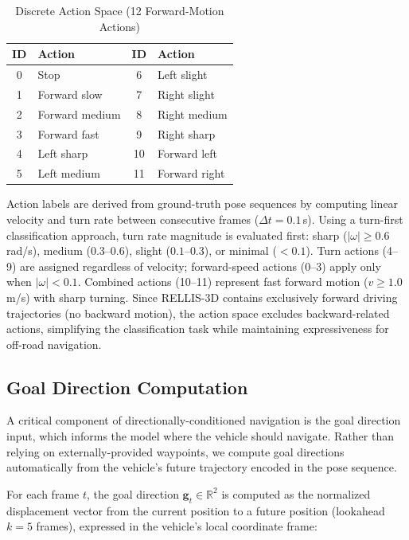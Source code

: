 \documentclass[journal]{IEEEtran}
\begin{document}
\begin{table}[h]
\caption{Discrete Action Space (12 Forward-Motion Actions)}
\label{tab:action_space}
\centering
\begin{tabular}{clcl}
\toprule
ID & Action & ID & Action \\
\midrule
0 & Stop & 6 & Left slight \\
1 & Forward slow & 7 & Right slight \\
2 & Forward medium & 8 & Right medium \\
3 & Forward fast & 9 & Right sharp \\
4 & Left sharp & 10 & Forward left \\
5 & Left medium & 11 & Forward right \\
\bottomrule
\end{tabular}
\end{table}

Action labels are derived from ground-truth pose sequences by computing linear velocity and turn rate between consecutive frames ($\Delta t = 0.1$\,s). Using a turn-first classification approach, turn rate magnitude is evaluated first: sharp ($|\omega| \geq 0.6$ rad/s), medium ($0.3$--$0.6$), slight ($0.1$--$0.3$), or minimal ($< 0.1$). Turn actions (4--9) are assigned regardless of velocity; forward-speed actions (0--3) apply only when $|\omega| < 0.1$. Combined actions (10--11) represent fast forward motion ($v \geq 1.0$ m/s) with sharp turning. Since RELLIS-3D contains exclusively forward driving trajectories (no backward motion), the action space excludes backward-related actions, simplifying the classification task while maintaining expressiveness for off-road navigation.

\subsection{Goal Direction Computation}
\label{sec:goal_direction}

A critical component of directionally-conditioned navigation is the goal direction input, which informs the model where the vehicle should navigate. Rather than relying on externally-provided waypoints, we compute goal directions automatically from the vehicle's future trajectory encoded in the pose sequence.

For each frame $t$, the goal direction $\mathbf{g}_t \in \mathbb{R}^2$ is computed as the normalized displacement vector from the current position to a future position (lookahead $k=5$ frames), expressed in the vehicle's local coordinate frame:
\end{document}
